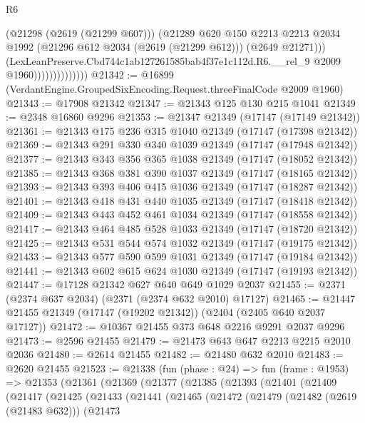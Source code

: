 \begin{lexlean}{R6}
\begin{coremodule}
                                (@21298 (@2619 (@21299 @607)))
                                (@21289
                                  @620
                                  @150
                                  @2213
                                  @2213
                                  @2034
                                  @1992
                                  (@21296 @612 @2034 (@2619 (@21299 @612)))
                                  (@2649 @21271)))
                              (LexLeanPreserve.Cbd744c1ab127261585bab4f37e1c112d.R6.__rel_9
                                @2009
                                @1960))))))))))))))
@21342 := @16899 (VerdantEngine.GroupedSixEncoding.Request.threeFinalCode @2009 @1960)
@21343 := @17908 @21342
@21347 := @21343 @125 @130 @215 @1041
@21349 := @2348 @16860 @9296
@21353 := @21347 @21349 (@17147 (@17149 @21342))
@21361 := @21343 @175 @236 @315 @1040 @21349 (@17147 (@17398 @21342))
@21369 := @21343 @291 @330 @340 @1039 @21349 (@17147 (@17948 @21342))
@21377 := @21343 @343 @356 @365 @1038 @21349 (@17147 (@18052 @21342))
@21385 := @21343 @368 @381 @390 @1037 @21349 (@17147 (@18165 @21342))
@21393 := @21343 @393 @406 @415 @1036 @21349 (@17147 (@18287 @21342))
@21401 := @21343 @418 @431 @440 @1035 @21349 (@17147 (@18418 @21342))
@21409 := @21343 @443 @452 @461 @1034 @21349 (@17147 (@18558 @21342))
@21417 := @21343 @464 @485 @528 @1033 @21349 (@17147 (@18720 @21342))
@21425 := @21343 @531 @544 @574 @1032 @21349 (@17147 (@19175 @21342))
@21433 := @21343 @577 @590 @599 @1031 @21349 (@17147 (@19184 @21342))
@21441 := @21343 @602 @615 @624 @1030 @21349 (@17147 (@19193 @21342))
@21447 := @17128 @21342 @627 @640 @649 @1029 @2037
@21455 := @2371 (@2374 @637 @2034) (@2371 (@2374 @632 @2010) @17127)
@21465 := @21447 @21455 @21349 (@17147 (@19202 @21342)) (@2404 (@2405 @640 @2037 @17127))
@21472 := @10367 @21455 @373 @648 @2216 @9291 @2037 @9296
@21473 := @2596 @21455
@21479 := @21473 @643 @647 @2213 @2215 @2010 @2036
@21480 := @2614 @21455
@21482 := @21480 @632 @2010
@21483 := @2620 @21455
@21523 := @21338
    (fun (phase : @24) =>
    fun (frame : @1953) =>
    @21353
      (@21361
        (@21369
          (@21377
            (@21385
              (@21393
                (@21401
                  (@21409
                    (@21417
                      (@21425
                        (@21433
                          (@21441
                            (@21465
                              (@21472
                                (@21479
                                  (@21482 (@2619 (@21483 @632)))
                                  (@21473

\end{coremodule}
\end{lexlean}
